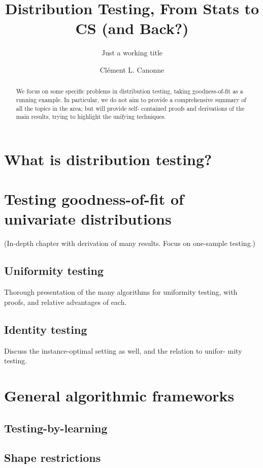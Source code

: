 \documentclass[biber]{nowfnt} %
\title{Distribution Testing, From Stats to CS (and Back?)}
\subtitle{Just a working title}
\author[1]{Cl\'ement L. Canonne}
\affil[1]{University of Sydney; clement.canonne@sydney.edu.au}
\begin{document}
\makeabstracttitle
\begin{abstract}
We focus on some specific problems in distribution testing,
taking goodness-of-fit as a running example. In particular,
we do not aim to provide a comprehensive summary of all
the topics in the area; but will provide self-
contained proofs and derivations of the main results, trying
to highlight the unifying techniques.
\end{abstract}

\chapter{What is distribution testing?}



\chapter{Testing goodness-of-fit of univariate distributions}
  \label{chap:identity}

(In-depth chapter with derivation of many results. Focus on one-sample
testing.)

\section{Uniformity testing}
Thorough presentation of the many algorithms for uniformity testing,
with proofs, and relative advantages of each.

\section{Identity testing}
Discuss the instance-optimal setting as well, and the relation to unifor-
mity testing.


\chapter{General algorithmic frameworks}
\section{Testing-by-learning}
\section{Shape restrictions}
\end{document}
